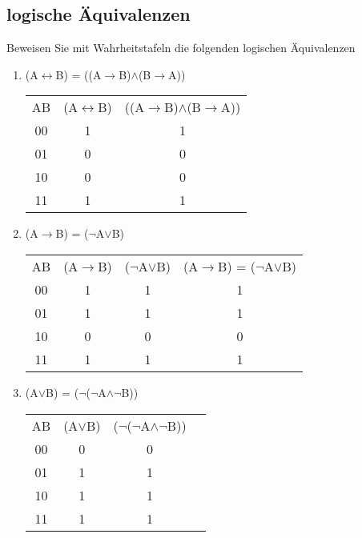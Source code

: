 \subsection{logische Äquivalenzen}
Beweisen Sie mit Wahrheitstafeln die folgenden logischen Äquivalenzen
\begin{enumerate}
    \item (A$\leftrightarrow$B) = ((A$\to$B)$\wedge$(B$\to$A))\\
        {\tiny
        \begin{tabular}{ccc}
            AB & (A$\leftrightarrow$B) & ((A$\to$B)$\wedge$(B$\to$A))\\
            00 & 1 & 1 \\
            01 & 0 & 0 \\
            10 & 0 & 0 \\
            11 & 1 & 1 \\
        \end{tabular}
        }
    \item (A$\to$B) = ($\neg$A$\vee$B)\\
        {\tiny
        \begin{tabular}{cccc}
            AB & (A$\to$B) & ($\neg$A$\vee$B) & (A$\to$B) = ($\neg$A$\vee$B)\\
            00 & 1 & 1 & 1\\
            01 & 1 & 1 & 1\\
            10 & 0 & 0 & 0\\
            11 & 1 & 1 & 1\\
        \end{tabular}
        }
    \item (A$\vee$B) = ($\neg$($\neg$A$\wedge$$\neg$B))\\
    {\tiny
    \begin{tabular}{cccc}
        AB & (A$\vee$B) & ($\neg$($\neg$A$\wedge$$\neg$B))\\
        00 & 0 & 0\\
        01 & 1 & 1\\
        10 & 1 & 1\\
        11 & 1 & 1\\
    \end{tabular}
    }
\end{enumerate}
